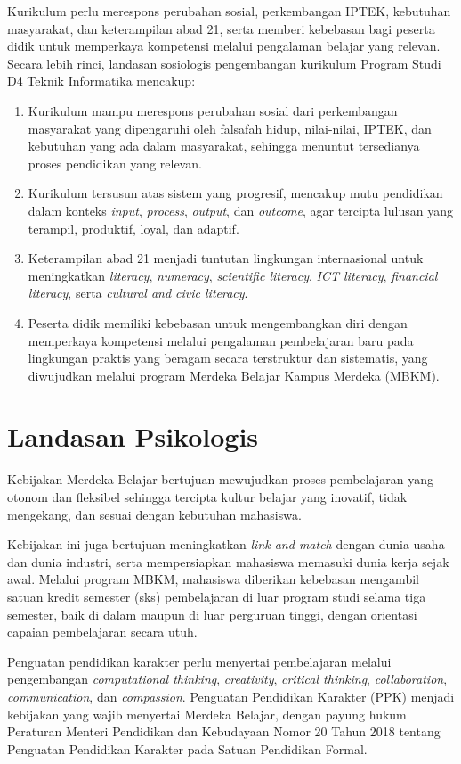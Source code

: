 Kurikulum perlu merespons perubahan sosial, perkembangan IPTEK, kebutuhan masyarakat, dan keterampilan abad 21, serta memberi kebebasan bagi peserta didik untuk memperkaya kompetensi melalui pengalaman belajar yang relevan. Secara lebih rinci, landasan sosiologis pengembangan kurikulum Program Studi D4 Teknik Informatika mencakup:
\begin{enumerate}
\item Kurikulum mampu merespons perubahan sosial dari perkembangan masyarakat yang dipengaruhi oleh falsafah hidup, nilai-nilai, IPTEK, dan kebutuhan yang ada dalam masyarakat, sehingga menuntut tersedianya proses pendidikan yang relevan.
\item Kurikulum tersusun atas sistem yang progresif, mencakup mutu pendidikan dalam konteks \emph{input}, \emph{process}, \emph{output}, dan \emph{outcome}, agar tercipta lulusan yang terampil, produktif, loyal, dan adaptif.
\item Keterampilan abad 21 menjadi tuntutan lingkungan internasional untuk meningkatkan \emph{literacy}, \emph{numeracy}, \emph{scientific literacy}, \emph{ICT literacy}, \emph{financial literacy}, serta \emph{cultural and civic literacy}.
\item Peserta didik memiliki kebebasan untuk mengembangkan diri dengan memperkaya kompetensi melalui pengalaman pembelajaran baru pada lingkungan praktis yang beragam secara terstruktur dan sistematis, yang diwujudkan melalui program Merdeka Belajar Kampus Merdeka (MBKM).
\end{enumerate}

\section{Landasan Psikologis}

Kebijakan Merdeka Belajar bertujuan mewujudkan proses pembelajaran yang otonom dan fleksibel sehingga tercipta kultur belajar yang inovatif, tidak mengekang, dan sesuai dengan kebutuhan mahasiswa.

Kebijakan ini juga bertujuan meningkatkan \emph{link and match} dengan dunia usaha dan dunia industri, serta mempersiapkan mahasiswa memasuki dunia kerja sejak awal. Melalui program MBKM, mahasiswa diberikan kebebasan mengambil satuan kredit semester (sks) pembelajaran di luar program studi selama tiga semester, baik di dalam maupun di luar perguruan tinggi, dengan orientasi capaian pembelajaran secara utuh.

Penguatan pendidikan karakter perlu menyertai pembelajaran melalui pengembangan \emph{computational thinking}, \emph{creativity}, \emph{critical thinking}, \emph{collaboration}, \emph{communication}, dan \emph{compassion}. Penguatan Pendidikan Karakter (PPK) menjadi kebijakan yang wajib menyertai Merdeka Belajar, dengan payung hukum Peraturan Menteri Pendidikan dan Kebudayaan Nomor 20 Tahun 2018 tentang Penguatan Pendidikan Karakter pada Satuan Pendidikan Formal.

